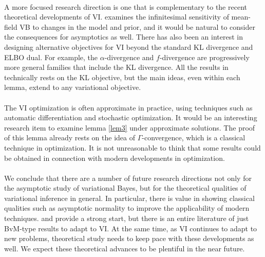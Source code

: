 \paragraph{} A more focused research direction is one that is complementary to the recent theoretical developments of VI. \cite{GiordanoJMLR} examines the infinitesimal sensitivity of mean-field VB to changes in the model and prior, and it would be natural to consider the consequences for asymptotics as well. There has also been an interest in designing alternative objectives for VI beyond the standard KL divergence and ELBO dual. For example, the $\alpha$-divergence \cite{renyi2016} and $f$-divergence \cite{f2020} are progressively more general families that include the KL divergence. All the results in \cite{Wang:2019:VBVM} technically rests on the KL objective, but the main ideas, even within each lemma, extend to any variational objective. 

\paragraph{} The VI optimization is often approximate in practice, using techniques such as automatic differentiation and stochastic optimization. It would be an interesting research item to examine lemma \ref{lem3} under approximate solutions. The proof of this lemma already rests on the idea of $\Gamma$-convergence, which is a classical technique in optimization. It is not unreasonable to think that some results could be obtained in connection with modern developments in optimization. 

\paragraph{} We conclude that there are a number of future research directions not only for the asymptotic study of variational Bayes, but for the theoretical qualities of variational inference in general. In particular, there is value in showing classical qualities such as asymptotic normality to improve the applicability of modern techniques. \cite{Wang:2019:VBVM} and \cite{Wang::mis2019} provide a strong start, but there is an entire literature of just BvM-type results to adapt to VI. At the same time, as VI continues to adapt to new problems, theoretical study needs to keep pace with these developments as well. We expect these theoretical advances to be plentiful in the near future. 